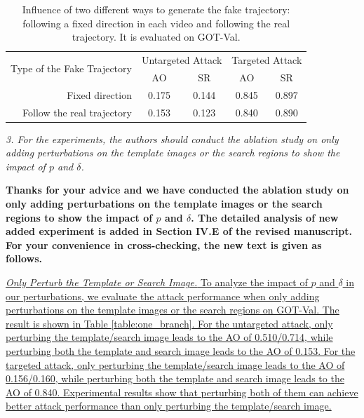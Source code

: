 \documentclass[12pt]{article}
\begin{document}
\begin{table}[t]
  \renewcommand\thetable{XI}
  \centering
  \caption{Influence of two different ways to generate the fake trajectory: following a fixed direction in each video and following the real trajectory. It is evaluated on GOT-Val.}
  \begin{tabular}{@{}rcccc@{}}
  \toprule
  \multirow{2}{*}[-2pt]{Type of the Fake Trajectory} & \multicolumn{2}{c}{Untargeted Attack} & \multicolumn{2}{c}{Targeted Attack} \\ \cmidrule{2-5}
                              & AO                & SR                & AO               & SR               \\ \midrule
  Fixed direction             & 0.175             & 0.144             & 0.845            & 0.897            \\
  Follow the real trajectory      & 0.153             & 0.123             & 0.840            & 0.890            \\ \bottomrule        
  \end{tabular}
  \label{table:direction}
\end{table}

\textit{3. For the experiments, the authors should conduct the ablation study on only adding perturbations on the template images or the search regions to show the impact of $p$ and $\delta$.}

\textbf{Thanks for your advice and we have conducted the ablation study on only adding perturbations on the template images or the search regions to show the impact of $p$ and $\delta$.
The detailed analysis of new added experiment is added in Section IV.E of the revised manuscript. For your convenience in cross-checking, the new text is given as follows.}

\uline{\textit{Only Perturb the Template or Search Image.} To analyze the impact of $p$ and $\delta$ in our perturbations, we evaluate the attack performance when only adding perturbations on the template images or the search regions on GOT-Val. The result is shown in Table \ref{table:one_branch}.
For the untargeted attack, only perturbing the template/search image leads to the AO of 0.510/0.714, while perturbing both the template and search image leads to the AO of 0.153.
For the targeted attack, only perturbing the template/search image leads to the AO of 0.156/0.160, while perturbing both the template and search image leads to the AO of 0.840. Experimental results show that perturbing both of them can achieve better attack performance than only perturbing the template/search image.}
\end{document}
